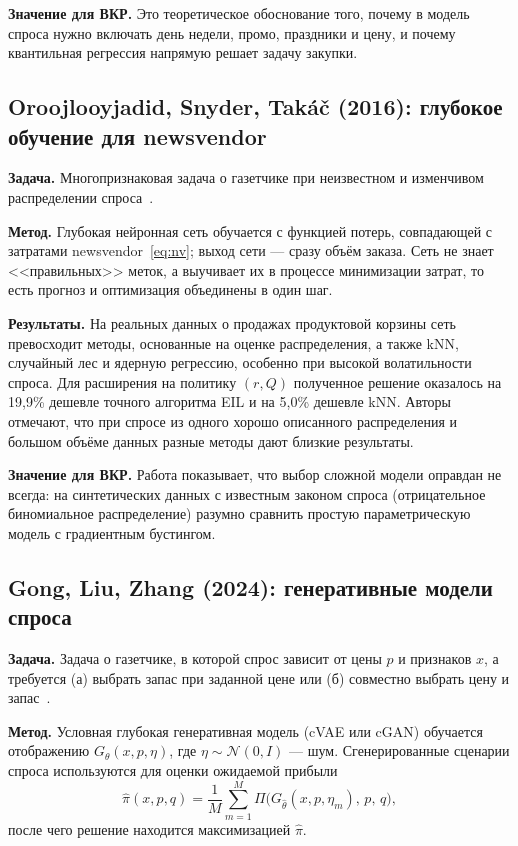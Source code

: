 \documentclass[12pt,a4paper]{article}
\begin{document}
\textbf{Значение для ВКР.} Это теоретическое обоснование того,
почему в модель спроса нужно включать день недели, промо, праздники
и цену, и почему квантильная регрессия напрямую решает задачу закупки.

\subsection{Oroojlooyjadid, Snyder, Takáč (2016): глубокое обучение для newsvendor}

\textbf{Задача.} Многопризнаковая задача о газетчике при неизвестном
и изменчивом распределении спроса~\cite{oroojlooy2016deep}.

\textbf{Метод.} Глубокая нейронная сеть обучается с функцией потерь,
совпадающей с затратами newsvendor~\eqref{eq:nv}; выход сети --- сразу
объём заказа. Сеть не знает <<правильных>> меток, а выучивает их
в процессе минимизации затрат, то есть прогноз и оптимизация
объединены в один шаг.

\textbf{Результаты.} На реальных данных о продажах продуктовой корзины
сеть превосходит методы, основанные на оценке распределения, а также
kNN, случайный лес и ядерную регрессию, особенно при высокой
волатильности спроса. Для расширения на политику $(r, Q)$ полученное
решение оказалось на 19{,}9\% дешевле точного алгоритма EIL
и на 5{,}0\% дешевле kNN. Авторы отмечают, что при спросе из одного
хорошо описанного распределения и большом объёме данных разные
методы дают близкие результаты.

\textbf{Значение для ВКР.} Работа показывает, что выбор сложной
модели оправдан не всегда: на синтетических данных с известным
законом спроса (отрицательное биномиальное распределение) разумно
сравнить простую параметрическую модель с градиентным бустингом.

\subsection{Gong, Liu, Zhang (2024): генеративные модели спроса}

\textbf{Задача.} Задача о газетчике, в которой спрос зависит
от цены $p$ и признаков $x$, а требуется (а) выбрать запас при заданной
цене или (б) совместно выбрать цену и запас~\cite{gong2024generative}.

\textbf{Метод.} Условная глубокая генеративная модель (cVAE или cGAN)
обучается отображению $G_\theta(x, p, \eta)$, где
$\eta \sim \mathcal{N}(0, I)$ --- шум. Сгенерированные сценарии спроса
используются для оценки ожидаемой прибыли
\begin{equation}
  \hat\pi(x,p,q) = \frac{1}{M}\sum_{m=1}^{M}
  \Pi\bigl(G_{\hat\theta}(x,p,\eta_m),\, p,\, q\bigr),
\end{equation}
после чего решение находится максимизацией $\hat\pi$.
\end{document}
